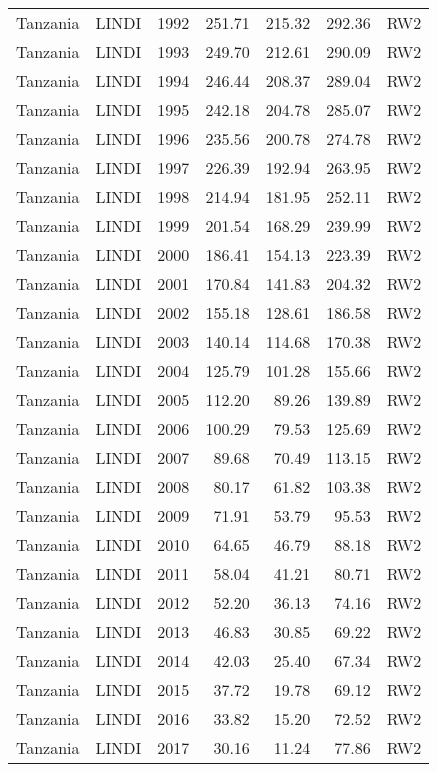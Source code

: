 \begin{longtable}{lllrrrl}
  Tanzania & LINDI & 1992 & 251.71 & 215.32 & 292.36 & RW2 \\ 
  Tanzania & LINDI & 1993 & 249.70 & 212.61 & 290.09 & RW2 \\ 
  Tanzania & LINDI & 1994 & 246.44 & 208.37 & 289.04 & RW2 \\ 
  Tanzania & LINDI & 1995 & 242.18 & 204.78 & 285.07 & RW2 \\ 
  Tanzania & LINDI & 1996 & 235.56 & 200.78 & 274.78 & RW2 \\ 
  Tanzania & LINDI & 1997 & 226.39 & 192.94 & 263.95 & RW2 \\ 
  Tanzania & LINDI & 1998 & 214.94 & 181.95 & 252.11 & RW2 \\ 
  Tanzania & LINDI & 1999 & 201.54 & 168.29 & 239.99 & RW2 \\ 
  Tanzania & LINDI & 2000 & 186.41 & 154.13 & 223.39 & RW2 \\ 
  Tanzania & LINDI & 2001 & 170.84 & 141.83 & 204.32 & RW2 \\ 
  Tanzania & LINDI & 2002 & 155.18 & 128.61 & 186.58 & RW2 \\ 
  Tanzania & LINDI & 2003 & 140.14 & 114.68 & 170.38 & RW2 \\ 
  Tanzania & LINDI & 2004 & 125.79 & 101.28 & 155.66 & RW2 \\ 
  Tanzania & LINDI & 2005 & 112.20 & 89.26 & 139.89 & RW2 \\ 
  Tanzania & LINDI & 2006 & 100.29 & 79.53 & 125.69 & RW2 \\ 
  Tanzania & LINDI & 2007 & 89.68 & 70.49 & 113.15 & RW2 \\ 
  Tanzania & LINDI & 2008 & 80.17 & 61.82 & 103.38 & RW2 \\ 
  Tanzania & LINDI & 2009 & 71.91 & 53.79 & 95.53 & RW2 \\ 
  Tanzania & LINDI & 2010 & 64.65 & 46.79 & 88.18 & RW2 \\ 
  Tanzania & LINDI & 2011 & 58.04 & 41.21 & 80.71 & RW2 \\ 
  Tanzania & LINDI & 2012 & 52.20 & 36.13 & 74.16 & RW2 \\ 
  Tanzania & LINDI & 2013 & 46.83 & 30.85 & 69.22 & RW2 \\ 
  Tanzania & LINDI & 2014 & 42.03 & 25.40 & 67.34 & RW2 \\ 
  Tanzania & LINDI & 2015 & 37.72 & 19.78 & 69.12 & RW2 \\ 
  Tanzania & LINDI & 2016 & 33.82 & 15.20 & 72.52 & RW2 \\ 
  Tanzania & LINDI & 2017 & 30.16 & 11.24 & 77.86 & RW2 \\ 

\end{longtable}
